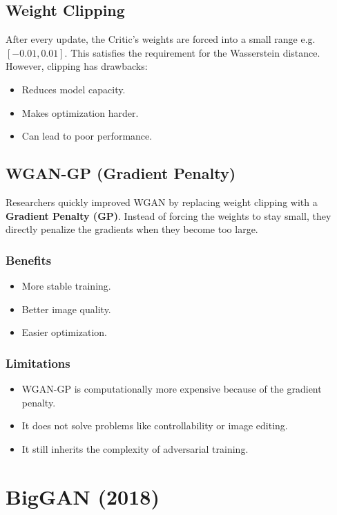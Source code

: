 \subsection*{Weight Clipping}

After every update, the Critic's weights are forced into a small range e.g. $[-0.01, 0.01]$. This satisfies the requirement for the Wasserstein distance. However, clipping has drawbacks:
\begin{itemize}
    \item Reduces model capacity.
    \item Makes optimization harder.
    \item Can lead to poor performance.
\end{itemize}

\subsection*{WGAN-GP (Gradient Penalty)}

Researchers quickly improved WGAN by replacing weight clipping with a \textbf{Gradient Penalty (GP)}. Instead of forcing the weights to stay small, they directly penalize the gradients when they become too large.

\subsubsection*{Benefits}
\begin{itemize}
    \item More stable training.
    \item Better image quality.
    \item Easier optimization.
\end{itemize}

\subsubsection*{Limitations}
\begin{itemize}
    \item WGAN-GP is computationally more expensive because of the gradient penalty.
    \item It does not solve problems like controllability or image editing.
    \item It still inherits the complexity of adversarial training.
\end{itemize}

\section{BigGAN (2018)}

